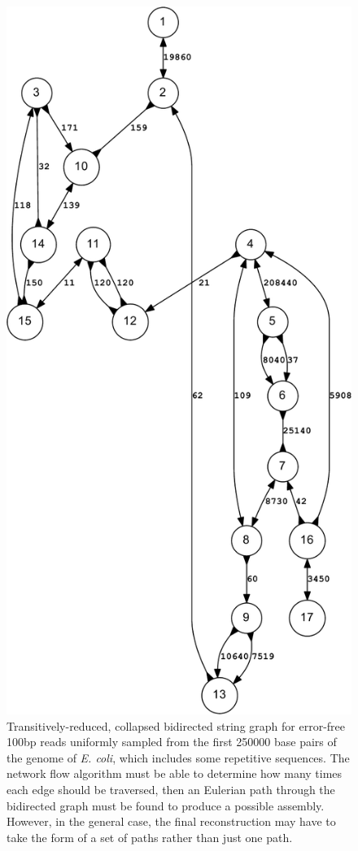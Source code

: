 \documentclass[letterpaper,12pt]{article}
\begin{document}
\begin{figure}
\caption{Transitively-reduced, collapsed bidirected string graph for error-free
100bp reads uniformly sampled from the first 250000 base pairs of the genome of
{\it E. coli}, which includes some repetitive sequences.  The network flow
algorithm must be able to determine how many times each edge should be
traversed, then an Eulerian path through the bidirected graph must be found to
produce a possible assembly.  However, in the general case, the final
reconstruction may have to take the form of a set of paths rather than just one
path.  }
\includegraphics[scale=0.6]{E_coli-crop.pdf}
\end{figure}
\end{document}
